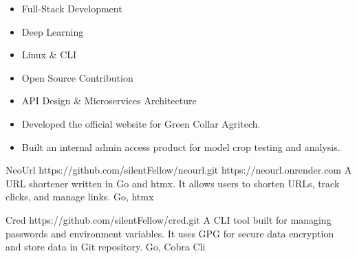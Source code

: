 \documentclass[10pt,a4paper,ragged2e,withhyper]{altacv}
\begin{document}
\begin{paracol}{2}

\begin{itemize}
    \item Full-Stack Development
    \item Deep Learning
    \item Linux \& CLI
    \item Open Source Contribution
    \item API Design & Microservices Architecture
\end{itemize}



\begin{itemize}
\item Developed the official website for Green Collar Agritech.
\item Built an internal admin access product for model crop testing and analysis.
\end{itemize}


\cvproject
  {NeoUrl}
  {https://github.com/silentFellow/neourl.git}
  {https://neourl.onrender.com}
  {}
  {A URL shortener written in Go and htmx. It allows users to shorten URLs, track clicks, and manage links.}
  {Go, htmx}

\divider

\cvproject
  {Cred}
  {https://github.com/silentFellow/cred.git}
  {}
  {}
  {A CLI tool built for managing passwords and environment variables. It uses GPG for secure data encryption and store data in Git repository.}
  {Go, Cobra Cli}


\end{paracol}
\end{document}
